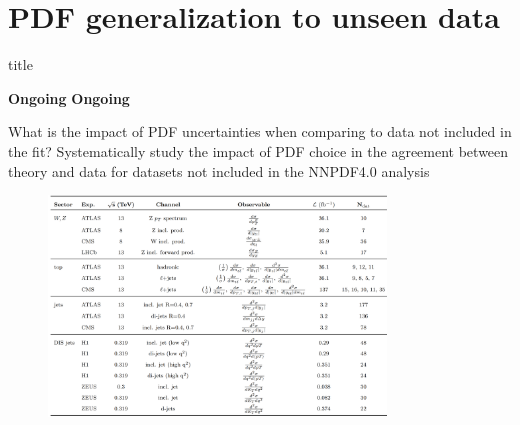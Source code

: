\documentclass[aspectratio=43, 8pt,t]{beamer}
\newcommand{\SectionTitleFrame}[1][]{%
  \begin{frame}
    \vfill
    \centering
    \begin{beamercolorbox}[sep=8pt,center,shadow=true,rounded=true]{title}
      \usebeamerfont{title}\insertsection\par
    \end{beamercolorbox}
    \ifx\relax#1\relax\else
      \vspace{0.5cm}
      \textbf{#1}
    \fi
    \vfill
  \end{frame}
}
\begin{document}
\section*{PDF generalization to unseen data}
\SectionTitleFrame[\textbf{Ongoing}]

\begin{frame}{What is the impact of PDF uncertainties when comparing to data not included in the fit?}
  Systematically study the impact of PDF choice in the agreement between theory and data for datasets not included in the NNPDF4.0 analysis

  \begin{figure}
    \includegraphics[width=0.8\textwidth]{pheno_paper_datasets.png}
  \end{figure}

\end{frame}
\end{document}
